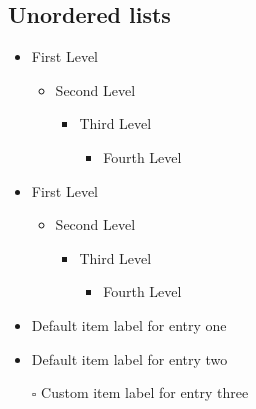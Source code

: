\documentclass{article}
\begin{document}
 \subsection{Unordered lists}
 
 \begin{itemize}
 \item  First Level
 \begin{itemize}
 \item  Second Level
 \begin{itemize}
 \item  Third Level
 \begin{itemize}
 \item  Fourth Level
 \end{itemize}
 \end{itemize}
 \end{itemize}
 \end{itemize}

 \renewcommand{\labelitemi}{$\blacksquare$}
 \renewcommand\labelitemii{$\square$}
 \begin{itemize}
 \item  First Level
 \begin{itemize}
 \item  Second Level
 \begin{itemize}
 \item  Third Level
 \begin{itemize}
 \item  Fourth Level
 \end{itemize}
 \end{itemize}
 \end{itemize}
 \end{itemize}

\begin{itemize}
 \item  Default item label for entry one
 \item  Default item label for entry two
 \item[$\square$]  Custom item label for entry three
\end{itemize}
\end{document}
